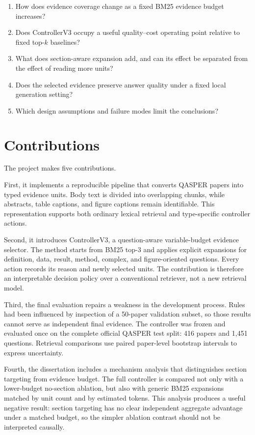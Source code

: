 \begin{enumerate}[label=\textbf{RQ\arabic*:}]
    \item How does evidence coverage change as a fixed BM25 evidence budget increases?
    \item Does ControllerV3 occupy a useful quality--cost operating point relative to fixed top-$k$ baselines?
    \item What does section-aware expansion add, and can its effect be separated from the effect of reading more units?
    \item Does the selected evidence preserve answer quality under a fixed local generation setting?
    \item Which design assumptions and failure modes limit the conclusions?
\end{enumerate}

\section{Contributions}

The project makes five contributions.

First, it implements a reproducible pipeline that converts QASPER papers into typed evidence units. Body text is divided into overlapping chunks, while abstracts, table captions, and figure captions remain identifiable. This representation supports both ordinary lexical retrieval and type-specific controller actions.

Second, it introduces ControllerV3, a question-aware variable-budget evidence selector. The method starts from BM25 top-3 and applies explicit expansions for definition, data, result, method, complex, and figure-oriented questions. Every action records its reason and newly selected units. The contribution is therefore an interpretable decision policy over a conventional retriever, not a new retrieval model.

Third, the final evaluation repairs a weakness in the development process. Rules had been influenced by inspection of a 50-paper validation subset, so those results cannot serve as independent final evidence. The controller was frozen and evaluated once on the complete official QASPER test split: 416 papers and 1,451 questions. Retrieval comparisons use paired paper-level bootstrap intervals to express uncertainty.

Fourth, the dissertation includes a mechanism analysis that distinguishes section targeting from evidence budget. The full controller is compared not only with a lower-budget no-section ablation, but also with generic BM25 expansions matched by unit count and by estimated tokens. This analysis produces a useful negative result: section targeting has no clear independent aggregate advantage under a matched budget, so the simpler ablation contrast should not be interpreted causally.

